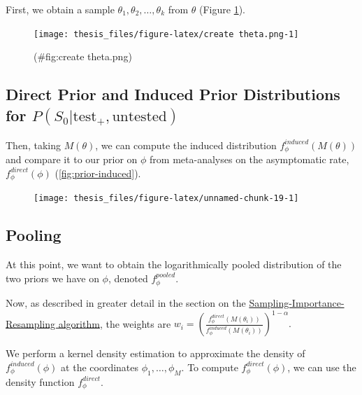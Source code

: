 \documentclass[12pt,twoside]{smiththesis}
\begin{document}
First, we obtain a sample \(\theta_1, \theta_2, \dots, \theta_k\) from \(\theta\) (Figure \ref{fig:theta}).
\begin{figure}

{\centering \texttt{[image: thesis\_files/figure-latex/create theta.png-1]} 

}

\caption{\label{fig:theta}}(\#fig:create theta.png)
\end{figure}
\hypertarget{direct-prior-and-induced-prior-distributions-for-ps_0texttest_textuntested}{%
\subsection{\texorpdfstring{Direct Prior and Induced Prior Distributions for \(P(S_0|\text{test}_+,\text{untested})\)}{Direct Prior and Induced Prior Distributions for P(S\_0\textbar\textbackslash text\{test\}\_+,\textbackslash text\{untested\})}}\label{direct-prior-and-induced-prior-distributions-for-ps_0texttest_textuntested}}

Then, taking \(M(\theta)\), we can compute the induced distribution \(f_\phi^{induced}(M(\theta))\) and compare it to our prior on \(\phi\) from meta-analyses on the asymptomatic rate, \(f_\phi^{direct}(\phi)\) (\ref{fig:prior-induced}).
\begin{figure}

{\centering \texttt{[image: thesis\_files/figure-latex/unnamed-chunk-19-1]} 

}

\caption{\label{fig:prior-induced}}\label{fig:unnamed-chunk-19}
\end{figure}
\hypertarget{pooling}{%
\subsection{Pooling}\label{pooling}}

At this point, we want to obtain the logarithmically pooled distribution of the two priors we have on \(\phi\), denoted \(f_\phi^{pooled}\).

Now, as described in greater detail in the section on the \protect\hyperlink{logpooled}{Sampling-Importance-Resampling algorithm}, the weights are \(w_i = \left( \frac{f_\phi^{direct}(M(\theta_i))}{f_\phi^{induced}(M(\theta_i))} \right)^{1-\alpha}.\)

We perform a kernel density estimation to approximate the density of \(f_\phi^{induced}(\phi)\) at the coordinates \(\phi_1, \dots, \phi_M\). To compute \(f_\phi^{direct}(\phi)\), we can use the density function \(f_\phi^{direct}\).
\end{document}

